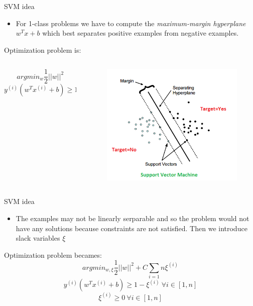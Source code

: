 \begin{frame}{SVM idea}
	\begin{itemize}\setlength\itemsep{1em}
		\item For 1-class problems we have to compute the \textit{maximum-margin hyperplane} $w^Tx + b$ which best separates positive examples from negative examples.
	\end{itemize}
	Optimization problem is:
	\begin{columns}
		\begin{column}{0.5\textwidth}\centering
			$$arg min_w \frac{1}{2} ||w||^2$$
			$$y^{(i)} (w^T x^{(i)} + b) \geq 1 \ \forall i \in [1, n]$$
		\end{column}
		\begin{column}{0.5\textwidth}\centering
			\begin{figure}[htbp]
				\centering
				\includegraphics[scale = 0.40]{./images/optimal-hyperplane2.png}
				
			\end{figure}
		\end{column}
	\end{columns}
	
	
	
\end{frame}

\begin{frame}{SVM idea}
	\begin{itemize}\setlength\itemsep{1em}
		\item The examples may not be linearly serparable and so the problem would not have any solutions because constraints are not satisfied. Then we introduce slack variables $\xi$
	\end{itemize}
	Optimization problem becames:
	$$arg min_{w, \xi} \frac{1}{2} ||w||^2 + C \sum_{i = 1}{n}\xi^{(i)}$$
	$$y^{(i)} (w^T x^{(i)} + b) \geq 1 - \xi^{(i)} \ \forall i \in [1, n]$$
	$$\xi^{(i)} \geq 0 \ \forall i \in [1, n]$$
\end{frame}
